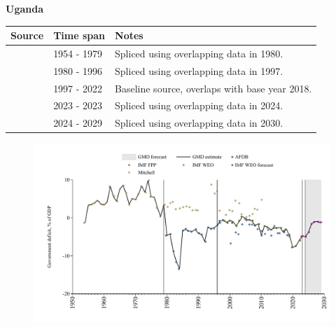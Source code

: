 \documentclass[12pt,a4paper,landscape]{article}
\begin{document}
\begin{adjustbox}{max totalsize={\paperwidth}{\paperheight},center}
\begin{minipage}[t][\textheight][t]{\textwidth}
\vspace*{0.5cm}
{}
\begin{center}
{\Large\bfseries Uganda}
\end{center}
\vspace{0.5cm}
\begin{table}[H]
\centering
\small
\begin{tabular}{|l|l|l|}
\hline
\textbf{Source} & \textbf{Time span} & \textbf{Notes} \\
\hline
\rowcolor{white}\cite{Mitchell}& 1954 - 1979 &Spliced using overlapping data in 1980.\\
\rowcolor{lightgray}\cite{AFDB}& 1980 - 1996 &Spliced using overlapping data in 1997.\\
\rowcolor{white}\cite{IMF_WEO}& 1997 - 2022 &Baseline source, overlaps with base year 2018.\\
\rowcolor{lightgray}\cite{IMF_FPP}& 2023 - 2023 &Spliced using overlapping data in 2024.\\
\rowcolor{white}\cite{IMF_WEO_forecast}& 2024 - 2029 &Spliced using overlapping data in 2030.\\
\hline
\end{tabular}
\end{table}
\begin{figure}[H]
\centering
\includegraphics[width=\textwidth,height=0.6\textheight,keepaspectratio]{graphs/UGA_govdef_GDP.pdf}
\end{figure}
\end{minipage}
\end{adjustbox}
\end{document}
